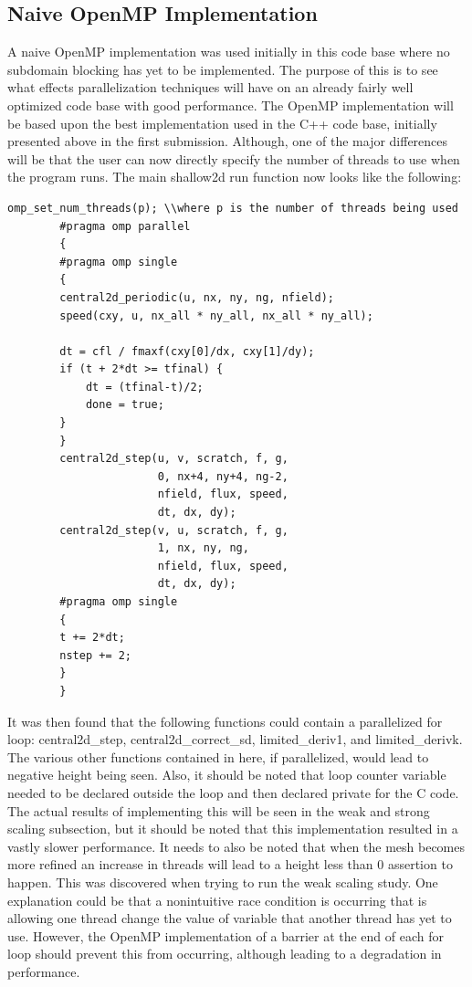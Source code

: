 \documentclass[12pt]{article}
\begin{document}
\subsection{Naive OpenMP Implementation}
A naive OpenMP implementation was used initially in this code base where no subdomain blocking has yet to be implemented. The purpose of this is to see what effects parallelization techniques will have on an already fairly well optimized code base with good performance. The OpenMP implementation will be based upon the best implementation used in the C++ code base, initially presented above in the first submission. Although, one of the major differences will be that the user can now directly specify the number of threads to use when the program runs. The main shallow2d run function now looks like the following:

\begin{verbatim}
omp_set_num_threads(p); \\where p is the number of threads being used
        #pragma omp parallel
        {
        #pragma omp single
        {
        central2d_periodic(u, nx, ny, ng, nfield);
        speed(cxy, u, nx_all * ny_all, nx_all * ny_all);

        dt = cfl / fmaxf(cxy[0]/dx, cxy[1]/dy);
        if (t + 2*dt >= tfinal) {
            dt = (tfinal-t)/2;
            done = true;
        }
        }
        central2d_step(u, v, scratch, f, g,
                       0, nx+4, ny+4, ng-2,
                       nfield, flux, speed,
                       dt, dx, dy);
        central2d_step(v, u, scratch, f, g,
                       1, nx, ny, ng,
                       nfield, flux, speed,
                       dt, dx, dy);
        #pragma omp single
        {
        t += 2*dt;
        nstep += 2;
        }
        }
\end{verbatim}

It was then found that the following functions could contain a parallelized for loop: central2d\_step, central2d\_correct\_sd, limited\_deriv1, and limited\_derivk. The various other functions contained in here, if parallelized, would lead to negative height being seen. Also, it should be noted that loop counter variable needed to be declared outside the loop and then declared private for the C code. The actual results of implementing this will be seen in the weak and strong scaling subsection, but it should be noted that this implementation resulted in a vastly slower performance. It needs to also be noted that when the mesh becomes more refined an increase in threads will lead to a height less than 0 assertion to happen. This was discovered when trying to run the weak scaling study. One explanation could be that a nonintuitive race condition is occurring that is allowing one thread change the value of variable that another thread has yet to use. However, the OpenMP implementation of a barrier at the end of each for loop should prevent this from occurring, although leading to a degradation in performance.
\end{document}
